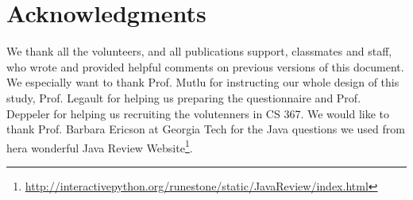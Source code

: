 \documentclass{sigchi}
\begin{document}
\section{Acknowledgments}

We thank all the volunteers, and all publications support, classmates  and staff, who wrote and provided helpful comments on previous versions of this document. 
We especially want to thank Prof. Mutlu for instructing our whole design of this study,  Prof. Legault for helping us preparing the questionnaire and Prof. Deppeler for helping us recruiting the volutenners in CS 367.
We would like to thank Prof. Barbara Ericson at Georgia Tech for the Java questions we used from hera wonderful Java Review Website\footnote{\url{http://interactivepython.org/runestone/static/JavaReview/index.html}}.
\end{document}
